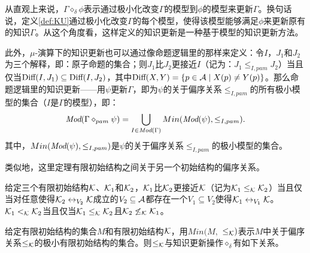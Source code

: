 从直观上来说，$\Gamma \diamond_{\delta} \phi$表示通过极小化改变$\Gamma$的模型到$\phi$的模型来更新$\Gamma$。换句话说，定义\ref{def:KU}通过极小化改变$\Gamma$的每个模型，使得该模型能够满足$\phi$来更新原有的知识$\Gamma$。从这个角度看，这样定义的知识更新是一种基于模型的知识更新方法。

此外，$\mu$-演算下的知识更新也可以通过像命题逻辑里的那样来定义：令$I$，$J_1$和$J_2$为三个解释，即：原子命题的集合；则$J_1$比$J_2$更接近$I$（记为：$J_1 \leq_{I,pam} J_2$）当且仅当$\textrm{Diff}(I, J_1) \subseteq \textrm{Diff}(I, J_2)$，其中$\textrm{Diff}(X, Y) =\{p\in {\cal A} \mid X(p) \not = Y(p)\}$。那么命题逻辑里的知识更新——用$\psi$更新$\Gamma$，即为$\psi$的关于偏序关系$\leq_{I,pam}$的所有极小模型的集合（$I$是$\Gamma$的模型），即：
$$\textit{Mod}(\Gamma \diamond_{pam} \psi) = \bigcup_{I \in \textit{Mod}(\Gamma)} Min(\textit{Mod}(\psi), \leq_{I,pam}).$$
其中，$Min(\textit{Mod}(\psi), \leq_{I,pam})$是$\psi$的关于偏序关系$\leq_{I,pam}$的极小模型的集合。

类似地，这里定理有限初始结构之间关于另一个初始结构的偏序关系。
\begin{definition}\label{def:closer}
	给定三个有限初始结构${\cal K}$、${\cal K}_1$和${\cal K}_2$，${\cal K}_1$比${\cal K}_2$更接近${\cal K}$（记为${\cal K}_1 \leq_{{\cal K}} {\cal K}_2$）当且仅当对任意使得${\cal K}_2 \leftrightarrow_{V_2} {\cal K}$成立的$V_2 \subseteq \mathcal{A}$都存在一个$V_1 \subseteq V_2$使得${\cal K}_1 \leftrightarrow_{V_1} {\cal K}$。
	 ${\cal K}_1 <_{{\cal K}} {\cal K}_2$当且仅当${\cal K}_1 \leq_{{\cal K}} {\cal K}_2$且${\cal K}_2 \not \leq_{{\cal K}} {\cal K}_1$。
\end{definition}

给定有限初始结构的集合$M$和有限初始结构${\cal K}$，用$Min(M,$ $\leq_{{\cal K}})$表示$M$中关于偏序关系$\leq_{{\cal K}}$的极小有限初始结构的集合。则$\leq_{{\cal K}}$与知识更新操作$\diamond_{\delta}$有如下关系。

